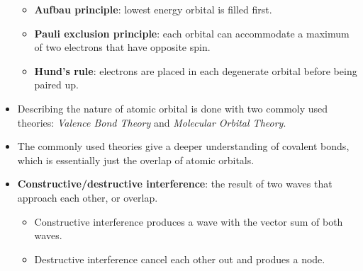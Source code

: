 \documentclass[12pt,a4paper]{article}
\begin{document}
\begin{itemize}
        \begin{itemize}
            \item \textbf{Aufbau principle}: lowest energy orbital is filled first.
            \item \textbf{Pauli exclusion principle}: each orbital can accommodate a maximum of two electrons that have opposite spin.
            \item \textbf{Hund's rule}: electrons are placed in each degenerate orbital before being paired up.
        \end{itemize}
    \item Describing the nature of atomic orbital is done with two commoly used theories: \textit{Valence Bond Theory} and \textit{Molecular Orbital Theory}.
    \item The commonly used theories give a deeper understanding of covalent bonds, which is essentially just the {\color{o-Sun}overlap of atomic orbitals}.
    \item \textbf{Constructive/destructive interference}: the result of two waves that approach each other, or overlap.
        \begin{itemize}
            \item Constructive interference produces a wave with the vector sum of both waves.
            \item Destructive interference cancel each other out and produes a node.
        \end{itemize}
\end{itemize}
\end{document}
